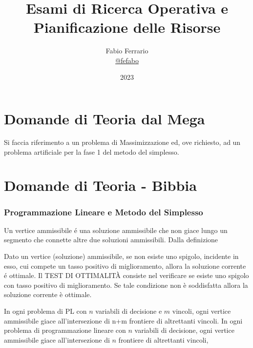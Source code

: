 \documentclass[12pt, a4paper, openany]{book}
\begin{document}
\title{Esami di Ricerca Operativa e Pianificazione delle Risorse}
\author{
	Fabio Ferrario\\
	\small{\href{https://t.me/fefabo}{@fefabo}}
}

\date{2023}
\maketitle


\tableofcontents

\chapter{Domande di Teoria dal Mega}
Si faccia riferimento a un problema di Massimizzazione ed, ove richiesto, ad un problema artificiale per la fase 1 del metodo del simplesso.



\chapter{Domande di Teoria - Bibbia}

\subsection{Programmazione Lineare e Metodo del Simplesso}

\affermazionetrue
{Un vertice ammissibile é una soluzione ammissibile che non giace lungo un segmento che connette altre due soluzioni ammissibili.}
{Dalla definizione}

\affermazionetrue
{Dato un vertice (soluzione) ammissibile, se non esiste uno spigolo, incidente in esso, cui compete un tasso positivo di miglioramento, allora la soluzione corrente é ottimale.}
{Il TEST DI OTTIMALITÀ consiste nel verificare se
esiste uno spigolo con tasso positivo di
miglioramento. Se tale condizione non è
soddisfatta allora la soluzione corrente è
ottimale.}

\affermazionefalse
{In ogni problema di PL con $n$ variabili di decisione e $m$ vincoli, ogni vertice ammissibile giace all'intersezione di n+m frontiere di altrettanti vincoli.}
{In ogni problema di programmazione lineare con $n$
variabili di decisione, ogni vertice ammissibile giace
all'intersezione di $n$ frontiere di altrettanti vincoli, }
\end{document}
